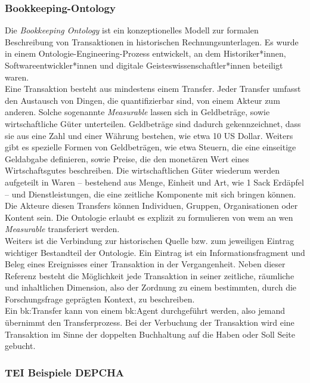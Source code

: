 \documentclass[12pt,a4paper]{article}
\begin{document}
\subsubsection{Bookkeeping-Ontology}

Die \textit{Bookkeeping Ontology} ist ein konzeptionelles Modell zur formalen Beschreibung von Transaktionen in historischen Rechnungsunterlagen. Es wurde in einem Ontologie-Engineering-Prozess entwickelt, an dem Historiker*innen, Softwareentwickler*innen und digitale Geisteswissenschaftler*innen beteiligt waren.  \\
Eine Transaktion besteht aus mindestens einem Transfer. Jeder Transfer umfasst den Austausch von Dingen, die quantifizierbar sind, von einem Akteur zum anderen. Solche sogenannte \textit{Measurable} lassen sich in Geldbeträge, sowie wirtschaftliche Güter unterteilen. Geldbeträge sind dadurch gekennzeichnet, dass sie aus eine Zahl und einer Währung bestehen, wie etwa 10 US Dollar. Weiters gibt es spezielle Formen von Geldbeträgen, wie etwa Steuern, die eine einseitige Geldabgabe definieren, sowie Preise, die den monetären Wert eines Wirtschaftsgutes beschreiben. Die wirtschaftlichen Güter wiederum werden aufgeteilt in Waren -- bestehend aus Menge, Einheit und Art, wie 1 Sack Erdäpfel -- und Dienstleistungen, die eine zeitliche Komponente mit sich bringen können. Die Akteure diesen Transfers können Individuen, Gruppen, Organisationen oder Kontent sein. Die Ontologie erlaubt es explizit zu formulieren von wem an wen \textit{Measurable} transferiert werden.
\\
Weiters ist die Verbindung zur historischen Quelle bzw. zum jeweiligen Eintrag wichtiger Bestandteil der Ontologie. Ein Eintrag ist ein Informationsfragment und Beleg eines Ereignisses einer Transaktion in der Vergangenheit. Neben dieser Referenz besteht die Möglichkeit jede Transaktion in seiner zeitliche, räumliche und inhaltlichen Dimension, also der Zordnung zu einem bestimmten, durch die Forschungsfrage geprägten Kontext, zu beschreiben.
\\
Ein bk:Transfer kann von einem bk:Agent durchgeführt werden, also jemand übernimmt den Transferprozess. Bei der Verbuchung der Transaktion wird eine Transaktion im Sinne der doppelten Buchhaltung auf die Haben oder Soll Seite gebucht. 

\subsubsection{TEI Beispiele DEPCHA}
\end{document}
